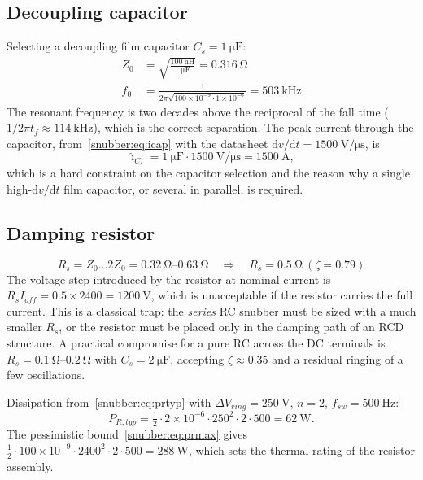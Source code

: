 \subsection{Decoupling capacitor}

Selecting a decoupling film capacitor $C_s = \SI{1}{\micro\farad}$:
\begin{align}
Z_0 &= \sqrt{\frac{\SI{100}{\nano\henry}}{\SI{1}{\micro\farad}}}
     = \SI{0.316}{\ohm} \\
f_0 &= \frac{1}{2\pi\sqrt{100\times10^{-9}\cdot 1\times10^{-6}}}
     = \SI{503}{\kilo\hertz}
\end{align}
The resonant frequency is two decades above the reciprocal of the fall time
($1/2\pi t_f \approx \SI{114}{\kilo\hertz}$), which is the correct
separation. The peak current through the capacitor,
from~\eqref{snubber:eq:icap} with the datasheet
$\mathrm{d}v/\mathrm{d}t = \SI{1500}{\volt\per\micro\second}$, is
\begin{equation}
\hat\imath_{C_s} = \SI{1}{\micro\farad}\cdot\SI{1500}{\volt\per\micro\second}
= \SI{1500}{\ampere},
\end{equation}
which is a hard constraint on the capacitor selection and the reason why a
single high-$\mathrm{d}v/\mathrm{d}t$ film capacitor, or several in parallel,
is required.

\subsection{Damping resistor}

\begin{equation}
R_s = Z_0 \ldots 2Z_0 = \SIrange{0.32}{0.63}{\ohm}
\quad\Rightarrow\quad R_s = \SI{0.5}{\ohm}\ (\zeta = 0.79)
\end{equation}
The voltage step introduced by the resistor at nominal current is
$R_s I_{off} = 0.5\times 2400 = \SI{1200}{\volt}$, which is unacceptable if
the resistor carries the full current. This is a classical trap: the
\emph{series} RC snubber must be sized with a much smaller $R_s$, or the
resistor must be placed only in the damping path of an RCD structure. A
practical compromise for a pure RC across the DC terminals is
$R_s = \SIrange{0.1}{0.2}{\ohm}$ with $C_s = \SI{2}{\micro\farad}$, accepting
$\zeta \approx 0.35$ and a residual ringing of a few oscillations.

Dissipation from~\eqref{snubber:eq:prtyp} with $\Delta V_{ring} = \SI{250}{\volt}$,
$n=2$, $f_{sw}=\SI{500}{\hertz}$:
\begin{equation}
P_{R,typ} = \tfrac{1}{2}\cdot 2\times10^{-6}\cdot 250^{2}\cdot 2\cdot 500
= \SI{62}{\watt}.
\end{equation}
The pessimistic bound~\eqref{snubber:eq:prmax} gives
$\tfrac12\cdot100\times10^{-9}\cdot2400^{2}\cdot2\cdot500 = \SI{288}{\watt}$,
which sets the thermal rating of the resistor assembly.

